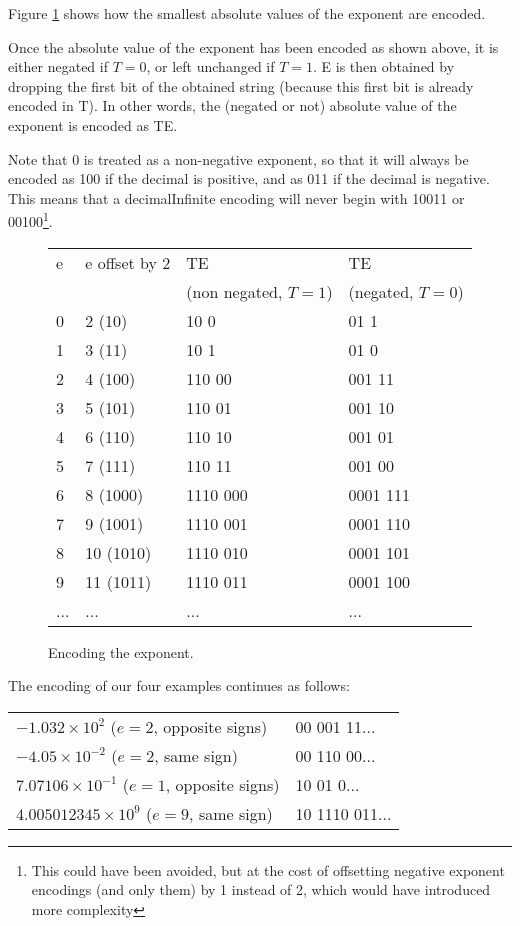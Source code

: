 \documentclass{acm_proc_article-sp}
\begin{document}
Figure \ref{figure-exponent-encoding} shows how the smallest absolute values of the exponent are encoded.

Once the absolute value of the exponent has been encoded as shown above, it is either negated if $T=0$, or left unchanged if $T=1$. E is then obtained by dropping the first bit of the obtained string (because this first bit is already encoded in T). In other words, the (negated or not) absolute value of the exponent is encoded as TE.

Note that 0 is treated as a non-negative exponent, so that it will always be encoded as 100 if the decimal is positive, and as 011 if the decimal is negative. This means that a decimalInfinite encoding will never begin with 10011 or 00100\footnote{This could have been avoided, but at the cost of offsetting negative exponent encodings (and only them) by 1 instead of 2, which would have introduced more complexity}.

\begin{figure}
\caption{Encoding the exponent.}
\label{figure-exponent-encoding}
\center
\begin{tabular}{|l|l|l|l|}
\hline
e & e offset by 2 & TE & TE\\
  &  & (non negated, $T=1$) & (negated, $T=0$)\\
\hline
0 & 2 (10) & 10 0 & 01 1  \\
\hline
1 & 3 (11) & 10 1  & 01 0\\
\hline
2 & 4 (100) & 110 00  & 001 11\\
\hline
3 & 5 (101) & 110 01 & 001 10\\
\hline
4 & 6 (110) & 110 10 & 001 01\\
\hline
5 & 7 (111) & 110 11 & 001 00\\
\hline
6 & 8 (1000) & 1110 000 & 0001 111\\
\hline
7 & 9 (1001) & 1110 001 & 0001 110\\
\hline
8 & 10 (1010) & 1110 010 & 0001 101\\
\hline
9 & 11 (1011) & 1110 011 & 0001 100\\
\hline
... & ... & ...& ...\\
\hline
\end{tabular}
\end{figure}

The encoding of our four examples continues as follows:

\begin{tabular}{l|l}
$- 1.032 \times 10^2$ ($e=2$, opposite signs) & 00 001 11... \\

$-4.05 \times 10^{-2}$ ($e=2$, same sign) & 00 110 00... \\

$7.07106 \times 10^{-1}$ ($e=1$, opposite signs) & 10 01 0... \\

$4.005012345 \times 10^9$ ($e=9$, same sign) & 10 1110 011...\\
\end{tabular}
\end{document}
